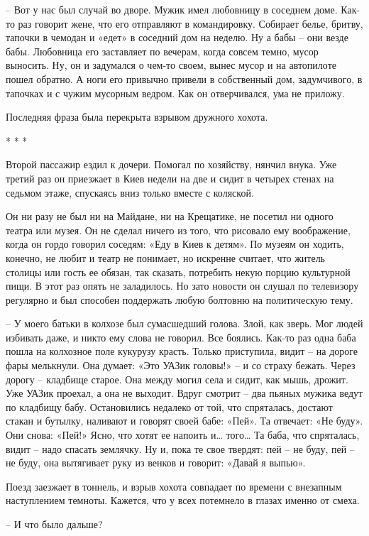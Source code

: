 – Вот у нас был случай во дворе. Мужик имел любовницу в соседнем доме. Как-то раз говорит жене, что его отправляют в командировку. Собирает белье, бритву, тапочки в чемодан и «едет» в соседний дом на неделю. Ну а бабы – они везде бабы. Любовница его заставляет по вечерам, когда совсем темно, мусор выносить. Ну, он и задумался о чем-то своем, вынес мусор и на автопилоте пошел обратно. А ноги его привычно привели в собственный дом, задумчивого, в тапочках и с чужим мусорным ведром. Как он отверчивался, ума не приложу.

Последняя фраза была перекрыта взрывом дружного хохота.

* * *

Второй пассажир ездил к дочери. Помогал по хозяйству, нянчил внука. Уже третий раз он приезжает в Киев недели на две и сидит в четырех стенах на седьмом этаже, спускаясь вниз только вместе с коляской.


Он ни разу не был ни на Майдане, ни на Крещатике, не посетил ни одного театра или музея. Он не сделал ничего из того, что рисовало ему воображение, когда он гордо говорил соседям: «Еду в Киев к детям». По музеям он ходить, конечно, не любит и театр не понимает, но искренне считает, что житель столицы или гость ее обязан, так сказать, потребить некую порцию культурной пищи. В этот раз опять не заладилось. Но зато новости он слушал по телевизору регулярно и был способен поддержать любую болтовню на политическую тему.

– У моего батьки в колхозе был сумасшедший голова. Злой, как зверь. Мог людей избивать даже, и никто ему слова не говорил. Все боялись. Как-то раз одна баба пошла на колхозное поле кукурузу красть. Только приступила, видит – на дороге фары мелькнули. Она думает: «Это УАЗик головы!» – и со страху бежать. Через дорогу – кладбище старое. Она между могил села и сидит, как мышь, дрожит. Уже УАЗик проехал, а она не выходит. Вдруг смотрит – два пьяных мужика ведут по кладбищу бабу. Остановились недалеко от той, что спряталась, достают стакан и бутылку, наливают и говорят своей бабе: «Пей». Та отвечает: «Не буду». Они снова: «Пей!» Ясно, что хотят ее напоить и… того… Та баба, что спряталась, видит – надо спасать землячку. Ну и, пока те свое твердят: пей – не буду, пей – не буду, она вытягивает руку из венков и говорит: «Давай я выпью».

Поезд заезжает в тоннель, и взрыв хохота совпадает по времени с внезапным наступлением темноты. Кажется, что у всех потемнело в глазах именно от смеха.

– И что было дальше?

